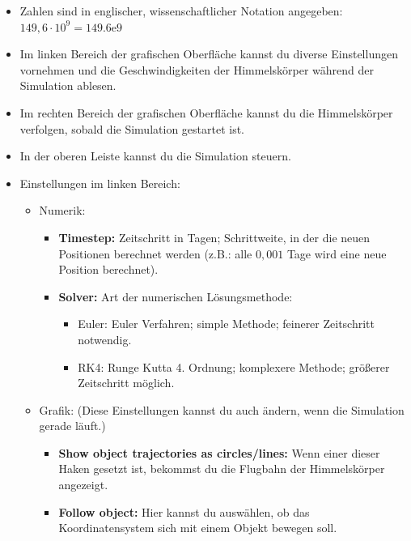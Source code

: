 \documentclass{scrartcl}
\begin{document}
        \begin{itemize}[leftmargin=*]
            \setlength\itemsep{0em}
            \item Zahlen sind in englischer, wissenschaftlicher Notation angegeben: $149,6\cdot10^9 = 149.6\mathrm{e}9$ %
            \item Im linken Bereich der grafischen Oberfläche kannst du diverse Einstellungen vornehmen und die Geschwindigkeiten der Himmelskörper während der Simulation ablesen.
            \item Im rechten Bereich der grafischen Oberfläche kannst du die Himmelskörper verfolgen, sobald die Simulation gestartet ist.
            \item In der oberen Leiste kannst du die Simulation steuern.
            \item Einstellungen im linken Bereich:
                \begin{itemize}
                    \item Numerik:
                    \begin{itemize}
                        \item \textbf{Timestep:} Zeitschritt in Tagen; Schrittweite, in der die neuen Positionen berechnet werden (z.B.: alle $0,001$ Tage wird eine neue Position berechnet).
                        \item \textbf{Solver:} Art der numerischen Lösungsmethode:
                        \begin{itemize}
                            \item Euler: Euler Verfahren; simple Methode; feinerer Zeitschritt notwendig.
                            \item RK4: Runge Kutta 4. Ordnung; komplexere Methode; größerer Zeitschritt möglich.
                        \end{itemize}
                    \end{itemize}
                    \item Grafik:
                    (Diese Einstellungen kannst du auch ändern, wenn die Simulation gerade läuft.)
                    \begin{itemize}
                    \item \textbf{Show object trajectories as circles/lines:} Wenn einer dieser Haken gesetzt ist, bekommst du die Flugbahn der Himmelskörper angezeigt.
                    \item \textbf{Follow object:} Hier kannst du auswählen, ob das Koordinatensystem sich mit einem Objekt bewegen soll.

\end{itemize}
\end{itemize}
\end{itemize}
\end{document}
